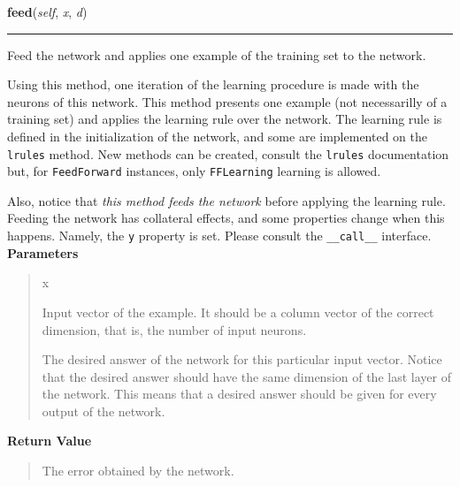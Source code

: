     \label{peach:nn:nnet:FeedForward:feed}

    \vspace{0.5ex}

\hspace{.8\funcindent}\begin{boxedminipage}{\funcwidth}

    \raggedright \textbf{feed}(\textit{self}, \textit{x}, \textit{d})

    \vspace{-1.5ex}

    \rule{\textwidth}{0.5\fboxrule}
\setlength{\parskip}{2ex}

Feed the network and applies one example of the training set to the
network.

Using this method, one iteration of the learning procedure is made with
the neurons of this network. This method presents one example (not
necessarilly of a training set) and applies the learning rule over the
network. The learning rule is defined in the initialization of the
network, and some are implemented on the \texttt{lrules} method. New methods
can be created, consult the \texttt{lrules} documentation but, for
\texttt{FeedForward} instances, only \texttt{FFLearning} learning is allowed.

Also, notice that \emph{this method feeds the network} before applying the
learning rule. Feeding the network has collateral effects, and some
properties change when this happens. Namely, the \texttt{y} property is set.
Please consult the \texttt{\_\_call\_\_} interface.
\setlength{\parskip}{1ex}
      \textbf{Parameters}
      \vspace{-1ex}

      \begin{quote}
        \begin{Ventry}{x}

          \item[x]


Input vector of the example. It should be a column vector of the
correct dimension, that is, the number of input neurons.
          \item[d]


The desired answer of the network for this particular input vector.
Notice that the desired answer should have the same dimension of the
last layer of the network. This means that a desired answer should
be given for every output of the network.
        \end{Ventry}

      \end{quote}

      \textbf{Return Value}
    \vspace{-1ex}

      \begin{quote}

The error obtained by the network.
      \end{quote}

    \end{boxedminipage}


